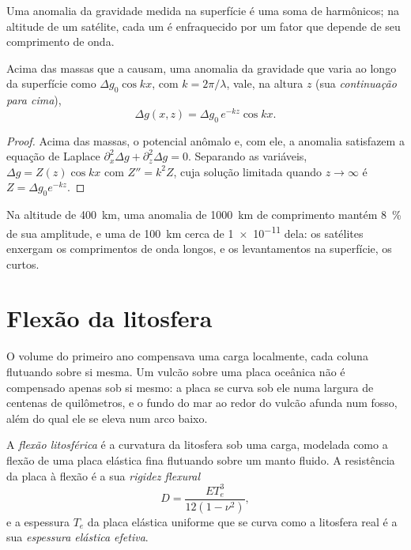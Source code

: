 Uma anomalia da gravidade medida na superfície é uma soma de harmônicos; na
altitude de um satélite, cada um é enfraquecido por um fator que depende de seu
comprimento de onda.

\begin{proposition}\label{prop:b3:gravity-geodesy:upward}
Acima das massas que a causam, uma anomalia da gravidade que varia ao longo da superfície
como $\Delta g_0\cos kx$, com $k = 2\pi/\lambda$, vale, na altura $z$ (sua
\emph{continuação para cima}),
\[
  \Delta g(x, z) = \Delta g_0\,e^{-kz}\cos kx .
\]
\end{proposition}

\begin{proof}
Acima das massas, o potencial anômalo e, com ele, a anomalia satisfazem a
equação de Laplace $\partial_x^2\Delta g + \partial_z^2\Delta g = 0$. Separando as
variáveis, $\Delta g = Z(z)\cos kx$ com $Z'' = k^2Z$, cuja solução limitada quando
$z \to \infty$ é $Z = \Delta g_0e^{-kz}$.
\end{proof}

Na altitude de \qty{400}{km}, uma anomalia de \qty{1000}{km} de comprimento mantém \qty{8}{\percent}
de sua amplitude, e uma de \qty{100}{km} cerca de \num{1e-11} dela:
os satélites enxergam os comprimentos de onda longos, e os levantamentos na superfície, os curtos.

\section{Flexão da litosfera}

O volume do primeiro ano compensava uma carga localmente, cada coluna flutuando sobre si mesma.
Um vulcão sobre uma placa oceânica não é compensado apenas sob si mesmo: a
placa se curva sob ele numa largura de centenas de quilômetros, e o fundo do mar
ao redor do vulcão afunda num fosso, além do qual ele se eleva num arco baixo.

\begin{definition}\label{def:b3:gravity-geodesy:flexure}
A \emph{flexão litosférica} é a curvatura da
litosfera sob uma carga, modelada como a flexão de uma placa elástica fina
flutuando sobre um manto fluido. A resistência da placa à flexão é a sua
\emph{rigidez flexural}
\[
  D = \frac{ET_e^3}{12(1 - \nu^2)},
\]
e a espessura $T_e$ da placa elástica uniforme que se curva como a litosfera real é a sua
\emph{espessura elástica efetiva}.
\end{definition}

